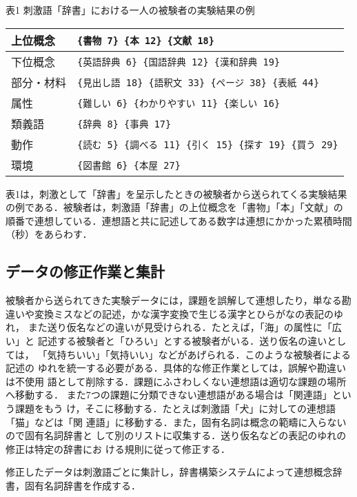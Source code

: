 \begin{center}
表1 刺激語「辞書」における一人の被験者の実験結果の例

\vspace*{1ex}
\begin{tabular}{|l|l|} \hline
上位概念    &\verb+{書物 7} {本 12} {文献 18}+\\ \hline
下位概念    &\verb+{英語辞典 6} {国語辞典 12} {漢和辞典 19}+\\ \hline
部分・材料  &\verb+{見出し語 18} {語釈文 33} {ページ 38} {表紙 44}+\\ \hline
属性        &\verb+{難しい 6} {わかりやすい 11} {楽しい 16}+\\ \hline
類義語      &\verb+{辞典 8} {事典 17}+\\ \hline
動作        &\verb+{読む 5} {調べる 11} {引く 15} {探す 19} {買う 29}+ \\ \hline
環境        &\verb+{図書館 6} {本屋 27}+\\ \hline
\end{tabular}
\end{center}

表1は，刺激として「辞書」を呈示したときの被験者から送られてくる実験結果
の例である．被験者は，刺激語「辞書」の上位概念を「書物」「本」「文献」の
順番で連想している．連想語と共に記述してある数字は連想にかかった累積時間
（秒）をあらわす．

\subsection{データの修正作業と集計}

被験者から送られてきた実験データには，課題を誤解して連想したり，単なる勘
違いや変換ミスなどの記述，かな漢字変換で生じる漢字とひらがなの表記のゆれ，
また送り仮名などの違いが見受けられる．たとえば，「海」の属性に「広い」と
記述する被験者と「ひろい」とする被験者がいる．送り仮名の違いとしては，
「気持ちいい」「気持いい」などがあげられる．このような被験者による記述の
ゆれを統一する必要がある．具体的な修正作業としては，誤解や勘違いは不使用
語として削除する．課題にふさわしくない連想語は適切な課題の場所へ移動する．
また7つの課題に分類できない連想語がある場合は「関連語」という課題をもう
け，そこに移動する．たとえば刺激語「犬」に対しての連想語「猫」などは「関
連語」に移動する．また，固有名詞は概念の範疇に入らないので固有名詞辞書と
して別のリストに収集する．送り仮名などの表記のゆれの修正は特定の辞書にお
ける規則\cite{Dai1995}に従って修正する．

修正したデータは刺激語ごとに集計し，辞書構築システムによって連想概念辞
書，固有名詞辞書を作成する．

